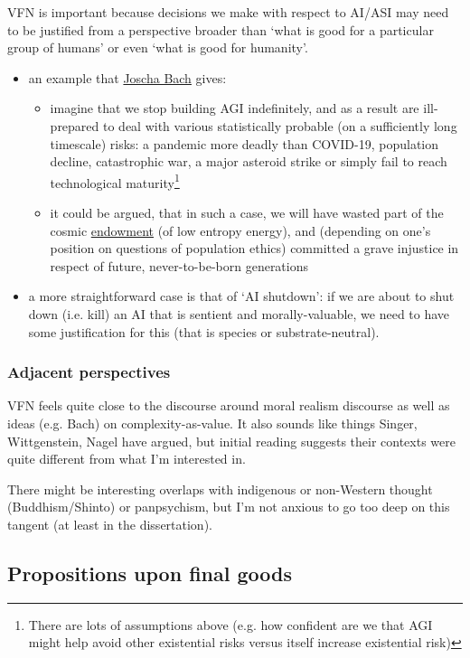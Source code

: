 \documentclass{article}
\begin{document}
VFN is important because decisions we make with respect to AI/ASI may need to be justified from a perspective broader than `what is good for a particular group of humans' or even `what is good for humanity'.
\begin{itemize}
\item an example that \href{https://joscha.substack.com/}{Joscha Bach} gives: 
\begin{itemize}
\item imagine that we stop building AGI indefinitely, and as a result are ill-prepared to deal with various statistically probable (on a sufficiently long timescale) risks: a pandemic more deadly than COVID-19, population decline, catastrophic war, a major asteroid strike or simply fail to reach technological maturity\footnote{There are lots of assumptions above (e.g. how confident are we that AGI might help avoid other existential risks versus itself increase existential risk)}
\item it could be argued, that in such a case, we will have wasted part of the cosmic \href{https://nickbostrom.com/astronomical/waste}{endowment} (of low entropy energy), and (depending on one's position on questions of population ethics) committed a grave injustice in respect of future, never-to-be-born generations 
\end{itemize}
\item a more straightforward case is that of `AI shutdown': if we are about to shut down (i.e. kill) an AI that is sentient and morally-valuable, we need to have some justification for this (that is species or substrate-neutral).
\end{itemize}



\subsubsection{Adjacent perspectives}

VFN feels quite close to the discourse around moral realism discourse as well as ideas (e.g. Bach) on complexity-as-value.  It also sounds like things Singer, Wittgenstein, Nagel have argued, but initial reading suggests their contexts were quite different from what I'm interested in.

There might be interesting overlaps with indigenous or non-Western thought (Buddhism/Shinto) or panpsychism, but I'm not anxious to go too deep on this tangent (at least in the dissertation).


\subsection{Propositions upon final goods}
\end{document}

